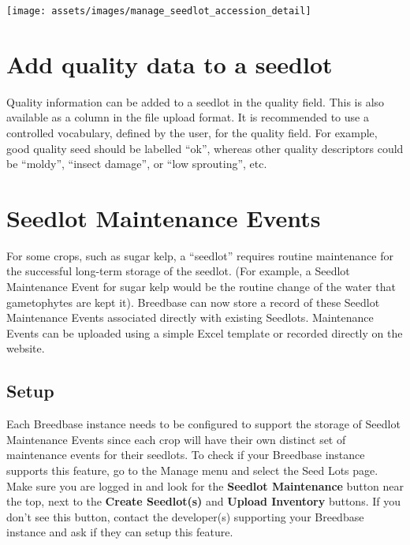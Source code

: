 \documentclass[
  12pt,
]{book}
\begin{document}
\begin{center}\texttt{[image: assets/images/manage\_seedlot\_accession\_detail]} \end{center}

\hypertarget{add-quality-data-to-a-seedlot}{%
\section{Add quality data to a seedlot}\label{add-quality-data-to-a-seedlot}}

Quality information can be added to a seedlot in the quality field. This is also available as a column in the file upload format. It is recommended to use a controlled vocabulary, defined by the user, for the quality field. For example, good quality seed should be labelled ``ok'', whereas other quality descriptors could be ``moldy'', ``insect damage'', or ``low sprouting'', etc.

\hypertarget{seedlot-maintenance-events}{%
\section{Seedlot Maintenance Events}\label{seedlot-maintenance-events}}

For some crops, such as sugar kelp, a ``seedlot'' requires routine maintenance for the successful long-term storage of the seedlot. (For example, a Seedlot Maintenance Event for sugar kelp would be the routine change of the water that gametophytes are kept it). Breedbase can now store a record of these Seedlot Maintenance Events associated directly with existing Seedlots. Maintenance Events can be uploaded using a simple Excel template or recorded directly on the website.

\hypertarget{setup}{%
\subsection{Setup}\label{setup}}

Each Breedbase instance needs to be configured to support the storage of Seedlot Maintenance Events since each crop will have their own distinct set of maintenance events for their seedlots. To check if your Breedbase instance supports this feature, go to the Manage menu and select the Seed Lots page. Make sure you are logged in and look for the \textbf{Seedlot Maintenance} button near the top, next to the \textbf{Create Seedlot(s)} and \textbf{Upload Inventory} buttons. If you don't see this button, contact the developer(s) supporting your Breedbase instance and ask if they can setup this feature.
\end{document}
